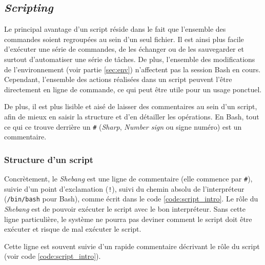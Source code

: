\newpage

\subsection{\textit{Scripting}}

Le principal avantage d'un script réside dans le fait que l'ensemble des commandes soient regroupées au sein d'un seul fichier. Il est ainsi plus facile d'exécuter une série de commandes, de les échanger ou de les sauvegarder et surtout d'automatiser une série de tâches. De plus, l'ensemble des modifications de l'environnement (voir partie \ref{sec:env}) n'affectent pas la session Bash en cours. Cependant, l'ensemble des actions réalisées dans un script peuvent l'être directement en ligne de commande, ce qui peut être utile pour un usage ponctuel.

De plus, il est plus lisible et aisé de laisser des commentaires au sein d'un script, afin de mieux en saisir la structure et d'en détailler les opérations. En Bash, tout ce qui ce trouve derrière un \texttt{\#} (\textit{Sharp}, \textit{Number sign} ou signe numéro) est un commentaire.

\subsubsection{Structure d'un script}
\begin{center}
\end{center}
\vspace{-0.5cm}
Concrètement, le \textit{Shebang} est une ligne de commentaire (elle commence par \texttt{\#}), suivie d'un point d'exclamation (\texttt{!}), suivi du chemin absolu de l'interpréteur (\texttt{/bin/bash} pour Bash), comme écrit dans le code \ref{code:script_intro}. Le rôle du \textit{Shebang} est de pouvoir exécuter le script avec le bon interpréteur. Sans cette ligne particulière, le système ne pourra pas deviner comment le script doit être exécuter et risque de mal exécuter le script.

Cette ligne est souvent suivie d’un rapide commentaire décrivant le rôle du script (voir code \ref{code:script_intro}).

